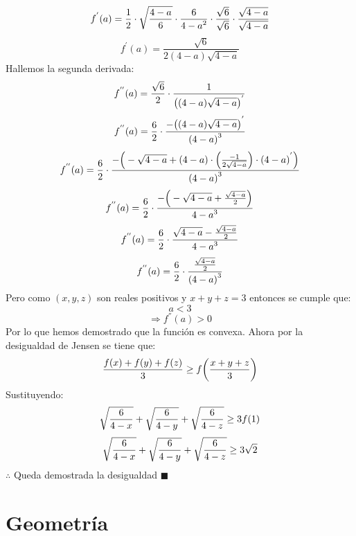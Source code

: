 \documentclass{book}
\begin{document}
\begin{enumerate}
        $$f^{'} (a)={1\over 2}\cdot\sqrt{\frac{4-a}{6}}\cdot\frac{6}{{4-a}^2} \cdot{\sqrt{6}\over\sqrt{6}}\cdot{\sqrt{4-a}\over\sqrt{4-a}}$$
        $$f^{'} (a)=\frac{\sqrt{6}}{2(4-a) \sqrt{4-a}}$$
        Hallemos la segunda derivada:
        $$f^{''} (a)={\sqrt{6}\over 2}\cdot\frac{1}{{\big((4-a)\sqrt{4-a}\big)}^{'}}$$
        $$f^{''} (a)={6\over 2}\cdot\frac{{-\big((4-a) \sqrt{4-a}\big)}^{'}}{{(4-a)}^3} $$
        $$f^{''} (a)={6\over 2}\cdot\frac{-\Big(-\sqrt{4-a}+(4-a)\cdot\Big(\frac{-1}{2\sqrt{4-a}}\Big)\cdot{(4-a)}^{'} \Big)}{{(4-a)}^3} $$
        $$f^{''} (a)={6\over 2}\cdot\frac{-\Big(-\sqrt{4-a}+\frac{\sqrt{4-a}}{2}\Big)}{{4-a}^3} $$
        $$f^{''} (a)={6\over 2}\cdot\frac{\sqrt{4-a}-\frac{\sqrt{4-a}}{2}}{{4-a}^3} $$
        $$f^{''} (a)={6\over 2}\cdot\frac{\frac{\sqrt{4-a}}{2}}{{(4-a)}^3} $$
        Pero como $(x,y,z)$ son reales positivos y $x+y+z=3$ entonces se cumple que:
        $$a<3$$
        $$\Rightarrow f^{''} (a)>0$$
        Por lo que hemos demostrado que la función es convexa. Ahora por la desigualdad de Jensen se tiene que:
        $${f(x)+f(y)+f(z)\over 3}\geq f\bigg({x+y+z\over 3}\bigg)$$
        Sustituyendo:
        $$\sqrt{{6\over 4-x}}+\sqrt{{6\over 4-y}}+\sqrt{{6\over 4-z}}\geq 3f(1)$$
        $$\sqrt{{6\over 4-x}}+\sqrt{{6\over 4-y}}+\sqrt{{6\over 4-z}}\geq 3\sqrt{2}$$
        $\therefore$ Queda demostrada la desigualdad $\blacksquare$\\
    \end{enumerate}


    \chapter{Geometría}
\end{document}
